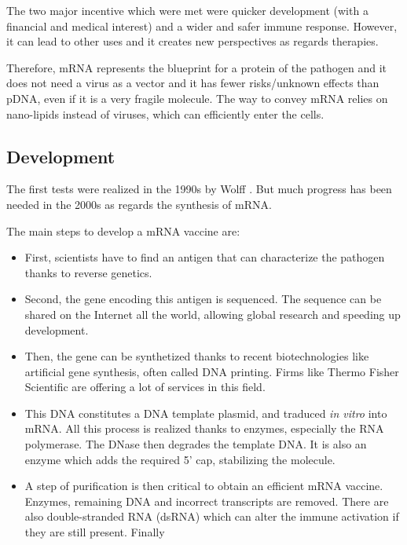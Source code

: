 \documentclass{article}
\begin{document}
                The two major incentive which were met were quicker development (with a financial and medical interest) and a wider and safer immune response.
                However, it can lead to other uses and it creates new perspectives as regards therapies.

                Therefore, mRNA represents the blueprint for a protein of the pathogen and it does not need a virus as a vector
                    and it has fewer risks/unknown effects than pDNA, even if it is a very fragile molecule.
                The way to convey mRNA relies on nano-lipids instead of viruses, which can efficiently enter the cells.


        \subsection{Development}

            The first tests were realized in the 1990s by Wolff \autocite{wolffDirectGeneTransfer1990}.
            But much progress has been needed in the 2000s as regards the synthesis of mRNA.

            The main steps to develop a mRNA vaccine are:
            \begin{itemize}
                \item First, scientists have to find an antigen that can characterize the pathogen thanks to reverse genetics.
                \item Second, the gene encoding this antigen is sequenced. 
                    The sequence can be shared on the Internet all the world, allowing global research and speeding up development.
                \item Then, the gene can be synthetized thanks to recent biotechnologies like artificial gene synthesis, often called DNA printing. 
                    Firms like Thermo Fisher Scientific are offering a lot of services in this field.
                \item This DNA constitutes a DNA template plasmid, and traduced \emph{in vitro} into mRNA.
                        All this process is realized thanks to enzymes, especially the RNA polymerase. The DNase then degrades the template DNA.
                        It is also an enzyme which adds the required 5' cap, stabilizing the molecule.
                \item A step of purification is then critical to obtain an efficient mRNA vaccine.
                        Enzymes, remaining DNA and incorrect transcripts are removed.
                        There are also double-stranded RNA (dsRNA) which can alter the immune activation if they are still present.
                        Finally 
            \end{itemize}
\end{document}
